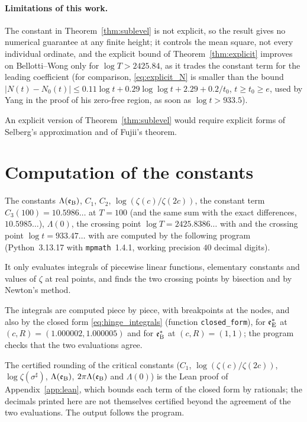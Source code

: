 \documentclass[11pt,a4paper]{article}
\makeatletter
\numberwithin{equation}{section}
\DeclareRobustCommand{\CGref}[1]{\ref{#1}}
\DeclareRobustCommand{\CGeqref}[1]{\eqref{#1}}
\DeclareRobustCommand{\CGcite}[2][]{\if\relax\detokenize{#1}\relax\cite{#2}\else\cite[#1]{#2}\fi}
\let\CG@origref\ref
\let\CG@origeqref\eqref
\newcommand{\CG@gettip}[1]{\@ifundefined{CGTip@#1}{#1}{\csname CGTip@#1\endcsname}}
\newcommand{\CG@getbib}[1]{\@ifundefined{CGBib@#1}{#1}{\csname CGBib@#1\endcsname}}
\DeclareRobustCommand{\CGref}[1]{\pdftooltip{\CG@origref{#1}}{\CG@gettip{#1}}}
\DeclareRobustCommand{\CGeqref}[1]{\pdftooltip{\CG@origeqref{#1}}{\CG@gettip{#1}}}
\DeclareRobustCommand{\CGcite}[2][]{\pdftooltip{\if\relax\detokenize{#1}\relax\cite{#2}\else\cite[#1]{#2}\fi}{\CG@getbib{#2}}}
\theoremstyle{definition}
\theoremstyle{remark}
\newcommand{\Nz}{N_0} %
\newcommand{\eB}{\mathfrak e_{\rm B}}
\newcommand{\eE}{\mathfrak e_{\rm E}}
\makeatother
\begin{document}
\paragraph{Limitations of this work.}
The constant in Theorem~\CGref{thm:sublevel} is not explicit, so the result gives no numerical guarantee at any finite height; it controls the mean square, not every individual ordinate, and the explicit bound of Theorem~\CGref{thm:explicit} improves on Bellotti--Wong only for $\log T>2425.84$, as it trades the constant term for the leading coefficient (for comparison, \CGeqref{eq:explicit_N} is smaller than the bound $|N(t)-\Nz(t)|\le0.11\log t+0.29\log\log t+2.29+0.2/t_0$, $t\ge t_0\ge e$, used by Yang \CGcite[(4.29)]{Yang2024} in the proof of his zero-free region, as soon as $\log t>933.5$).

An explicit version of Theorem~\CGref{thm:sublevel} would require explicit forms of Selberg's approximation and of Fujii's theorem.

\appendix
\section{Computation of the constants}\label{app:code}
The constants $\Lambda(\eB)$, $C_1$, $C_2$, $\log(\zeta(c)/\zeta(2c))$, the constant term $C_3(100)=10.5986\ldots$ at $T=100$ (and the same sum with the exact differences, $10.5985\ldots$), $\Lambda(0)$, the crossing point $\log T=2425.8386\ldots$ with \CGcite{BellottiWong2025} and the crossing point $\log t=933.47\ldots$ with \CGcite[(4.29)]{Yang2024} are computed by the following program (Python~3.13.17 with \texttt{mpmath}~1.4.1, working precision $40$ decimal digits).

It only evaluates integrals of piecewise linear functions, elementary constants and values of $\zeta$ at real points, and finds the two crossing points by bisection and by Newton's method.

The integrals are computed piece by piece, with breakpoints at the nodes, and also by the closed form \CGeqref{eq:hinge_integrals} (function \texttt{closed\_form}), for $\eE^*$ at $(c,R)=(1.000002,1.000005)$ and for $\eB^*$ at $(c,R)=(1,1)$; the program checks that the two evaluations agree.

The certified rounding of the critical constants ($C_1$, $\log(\zeta(c)/\zeta(2c))$, $\log\zeta(\sigma^\sharp)$, $\Lambda(\eB)$, $2\pi\Lambda(\eB)$ and $\Lambda(0)$) is the Lean proof of Appendix~\CGref{app:lean}, which bounds each term of the closed form by rationals; the decimals printed here are not themselves certified beyond the agreement of the two evaluations. The output follows the program.
\end{document}

